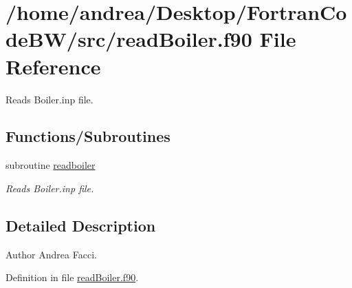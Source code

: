 \hypertarget{read_boiler_8f90}{\section{/home/andrea/\-Desktop/\-Fortran\-Code\-B\-W/src/read\-Boiler.f90 File Reference}
\label{read_boiler_8f90}
}


Reads Boiler.\-inp file.  


\subsection*{Functions/\-Subroutines}
\begin{DoxyCompactItemize}
\item 
subroutine \hyperlink{read_boiler_8f90_adab96107665a1fca087b8e0a54026105}{readboiler}
\begin{DoxyCompactList}\small\item\em Reads Boiler.\-inp file. \end{DoxyCompactList}\end{DoxyCompactItemize}


\subsection{Detailed Description}
\begin{DoxyAuthor}{Author}
Andrea Facci. 
\end{DoxyAuthor}


Definition in file \hyperlink{read_boiler_8f90_source}{read\-Boiler.\-f90}.



